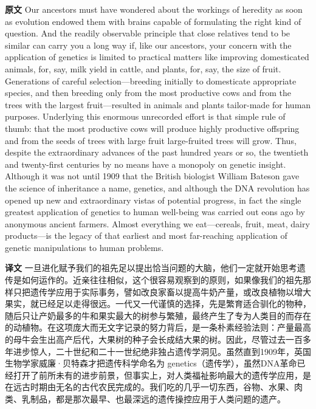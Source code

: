 \documentclass[UTF8,zihao=-4]{ctexart}
\newcommand{\BodyFont}{\fontsize{10.5pt}{15.5pt}\selectfont}
\renewenvironment{quote}{\par\noindent\begingroup\BodyFont}{\par\endgroup}
\begin{document}
\begin{quote}
\noindent\textbf{原文} Our ancestors must have wondered about the workings of heredity as soon as evolution endowed them with brains capable of formulating the right kind of question. And the readily observable principle that close relatives tend to be similar can carry you a long way if, like our ancestors, your concern with the application of genetics is limited to practical matters like improving domesticated animals, for, say, milk yield in cattle, and plants, for, say, the size of fruit. Generations of careful selection---breeding initially to domesticate appropriate species, and then breeding only from the most productive cows and from the trees with the largest fruit---resulted in animals and plants tailor-made for human purposes. Underlying this enormous unrecorded effort is that simple rule of thumb: that the most productive cows will produce highly productive offspring and from the seeds of trees with large fruit large-fruited trees will grow. Thus, despite the extraordinary advances of the past hundred years or so, the twentieth and twenty-first centuries by no means have a monopoly on genetic insight. Although it was not until 1909 that the British biologist William Bateson gave the science of inheritance a name, genetics, and although the DNA revolution has opened up new and extraordinary vistas of potential progress, in fact the single greatest application of genetics to human well-being was carried out eons ago by anonymous ancient farmers. Almost everything we eat---cereals, fruit, meat, dairy products---is the legacy of that earliest and most far-reaching application of genetic manipulations to human problems.

\smallskip
\noindent\textbf{译文} 一旦进化赋予我们的祖先足以提出恰当问题的大脑，他们一定就开始思考遗传是如何运作的。近亲往往相似，这个很容易观察到的原则，如果像我们的祖先那样只把遗传学应用于实际事务，譬如改良家畜以提高牛奶产量，或改良植物以增大果实，就已经足以走得很远。一代又一代谨慎的选择，先是繁育适合驯化的物种，随后只让产奶最多的牛和果实最大的树参与繁殖，最终产生了专为人类目的而存在的动植物。在这项庞大而无文字记录的努力背后，是一条朴素经验法则：产量最高的母牛会生出高产后代，大果树的种子会长成结大果的树。因此，尽管过去一百多年进步惊人，二十世纪和二十一世纪绝非独占遗传学洞见。虽然直到1909年，英国生物学家威廉·贝特森才把遗传科学命名为 genetics（遗传学），虽然DNA革命已经打开了前所未有的进步前景，但事实上，对人类福祉影响最大的遗传学应用，是在远古时期由无名的古代农民完成的。我们吃的几乎一切东西，谷物、水果、肉类、乳制品，都是那次最早、也最深远的遗传操控应用于人类问题的遗产。
\end{quote}
\end{document}
